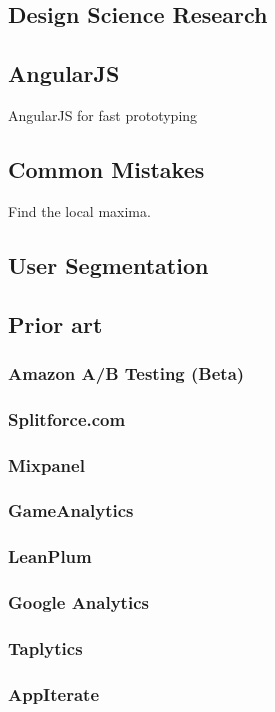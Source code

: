 \documentclass[english,12pt,a4paper,pdftex,elec,utf8]{aaltothesis}
\begin{document}
\subsection{Design Science Research}

\subsection{AngularJS}
AngularJS for fast prototyping

\subsection{Common Mistakes}
Find the local maxima.



\subsection{User Segmentation}


\subsection{Prior art}

\subsubsection{Amazon A/B Testing (Beta)}
\subsubsection{Splitforce.com}
\subsubsection{Mixpanel}
\subsubsection{GameAnalytics}
\subsubsection{LeanPlum}
\subsubsection{Google Analytics}
\subsubsection{Taplytics}
\subsubsection{AppIterate}
\end{document}

